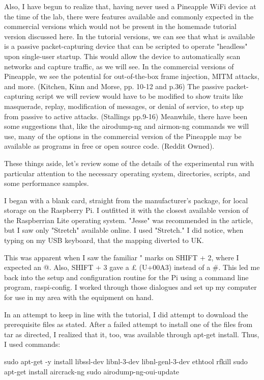 Also, I have begun to realize that, having never used a Pineapple WiFi device at the time of the lab, there were features available and commonly expected in the commercial versions which would not be present in the homemade tutorial version discussed here.  In the tutorial versions, we can see that what is available is a passive packet-capturing device that can be scripted to operate "headless" upon single-user startup.  This would allow the device to automatically scan networks and capture traffic, as we will see.  In the commercial versions of Pineapple, we see the potential for out-of-the-box frame injection, MITM attacks, and more.  (Kitchen, Kinn and Morse,  pp. 10-12 and p.36)  The passive packet-capturing script we will review would have to be modified to show traits like masquerade, replay, modification of messages, or denial of service, to step up from passive to active attacks.  (Stallings  pp.9-16)  Meanwhile, there have been some suggestions that, like the airodump-ng and airmon-ng commands we will use, many of the options in the commercial version of the Pineapple may be available as programs in free or open source code.  (Reddit Owned).

These things aside, let's review some of the details of the experimental run with particular attention to the necessary \gls{operating system}, directories, scripts, and some performance samples.

I began with a blank card, straight from the manufacturer's package, for local storage on the Raspberry Pi.  I outfitted it with the closest available version of the Raspberrian Lite \gls{operating system}.  "Jesse" was recommended in the article, but I saw only "Stretch" available online.  I used "Stretch."  I did notice, when typing on my USB keyboard, that the mapping diverted to UK.

This was apparent when I saw the familiar " marks on SHIFT + 2, where I expected an @.  Also, SHIFT + 3 gave a £
(U+00A3) instead of a \#.  This led me back into the setup and \gls{configuration} routine for the Pi using a command line program, raspi-config.  I worked through those dialogues and set up my computer for use in my area with the equipment on hand.

In an attempt to keep in line with the tutorial, I did attempt to download the prerequisite files as stated.  After a failed attempt to install one of the files from tar as directed, I realized that it, too, was available through apt-get install.  Thus, I used commands:

sudo apt-get -y install libssl-dev libnl-3-dev libnl-genl-3-dev ethtool rfkill
sudo apt-get install aircrack-ng
sudo airodump-ng-oui-update


